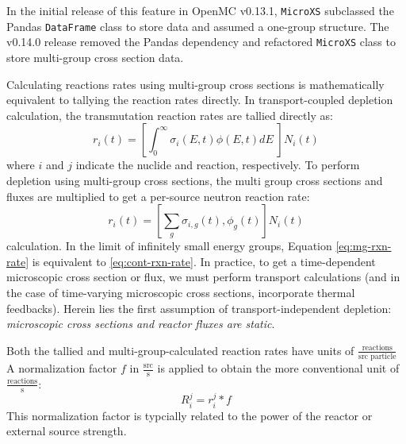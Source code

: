         In the initial release of this feature in OpenMC v0.13.1, \verb.MicroXS.
        subclassed the Pandas \verb.DataFrame. class to store data and assumed a
        one-group structure. The v0.14.0 release removed the Pandas dependency
        and refactored \verb.MicroXS. class to store multi-group cross section
        data.
        
        Calculating reactions rates using multi-group cross sections is
        mathematically equivalent to tallying the reaction rates directly. In
        transport-coupled depletion calculation, the transmutation reaction
        rates are tallied directly as:
        \begin{equation}
            \label{eq:cont-rxn-rate}
            r_{i}(t) = \left[\int_0^\infty \sigma_i(E,t) \phi(E,t) dE \; \right]
            N_{i}(t)
        \end{equation}
        where $i$ and $j$ indicate the nuclide and reaction, respectively.
            To perform depletion using multi-group cross sections, the multi group
        cross sections and fluxes are multiplied to get a per-source neutron
        reaction rate:
        \begin{equation}
            \label{eq:mg-rxn-rate}
            r_{i}(t) = \left[\sum_{g} \sigma_{i,g}(t), \phi_{g}(t) \right]
            N_{i}(t) 
        \end{equation}
        calculation. In the limit of infinitely small energy groups, Equation
        \ref{eq:mg-rxn-rate} is equivalent to \ref{eq:cont-rxn-rate}. In
        practice, to get a time-dependent microscopic cross section or flux, we
        must perform transport calculations (and in the case of time-varying
        microscopic cross sections, incorporate thermal feedbacks). Herein lies the first
        assumption of transport-independent depletion: {\it microscopic cross
        sections and reactor fluxes are static}.

        Both the tallied and multi-group-calculated reaction rates have units of
        $\frac{\text{reactions}}{\text{src particle}}$ A normalization factor
        $f$ in $\frac{\text{src}}{\text{s}}$ is applied to obtain the more
        conventional unit of $\frac{\text{reactions}}{\text{s}}$:
        \begin{equation}
            R^j_i = r^j_i * f
        \end{equation}
        This normalization factor is typcially related to the power of the
        reactor or external source strength.

